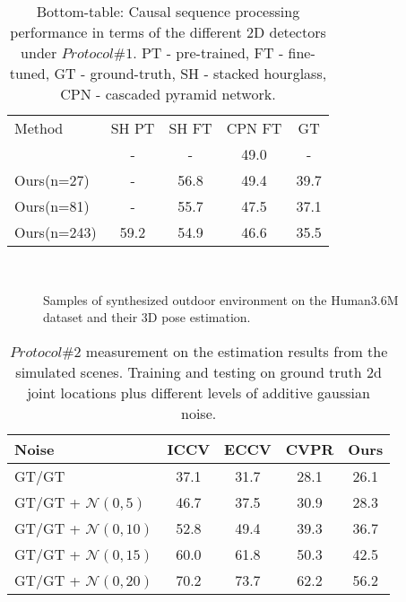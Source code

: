 \documentclass[twocolumn]{svjour3}          \smartqed  \usepackage{graphicx}
\begin{document}
\begin{table}[h]
	\begin{center}
			\begin{tabular}{l|c|c|c|c}
				\toprule
				Method & SH PT  & SH FT & CPN FT & GT \\
				\citep{Pavllo2019} & - & - & 49.0 & -\\
				Ours(n=27) & - & 56.8 & 49.4 & 39.7\\
				Ours(n=81) & - & 55.7 & 47.5 & 37.1\\
				Ours(n=243) & 59.2 & 54.9 & 46.6 & 35.5\\
				\bottomrule
			\end{tabular}
	\end{center}
	\caption{Bottom-table: Causal sequence processing performance in terms of the different 2D detectors  under $Protocol \#1$. PT - pre-trained, FT - fine-tuned, GT - ground-truth, SH - stacked hourglass, CPN - cascaded pyramid network.}
	\label{tb:causal}
\end{table}

\begin{figure}[h!]
\\
\caption{Samples of synthesized outdoor environment on the Human3.6M dataset and their 3D pose estimation.}\label{fig:noisyEffects}
\end{figure}

\begin{table*}[h!]
	\begin{center}
			\begin{tabular}{l|c c c c}
				\toprule
				 Noise & ICCV\citep{Martinez2017} & ECCV\citep{Hossain2018} & CVPR\citep{Pavllo2019} & Ours\\
				\midrule
				GT/GT & 37.1 & 31.7 & 28.1 & 26.1\\
				GT/GT + $\mathcal{N}(0,5)$  & 46.7 & 37.5 & 30.9 & 28.3\\
				GT/GT + $\mathcal{N}(0,10)$ & 52.8 & 49.4 & 39.3 & 36.7\\
				GT/GT + $\mathcal{N}(0,15)$ & 60.0 & 61.8 & 50.3 & 42.5\\
				GT/GT + $\mathcal{N}(0,20)$ & 70.2 & 73.7 & 62.2 & 56.2\\
				\bottomrule
			\end{tabular}
	\end{center}
	\caption{$Protocol \#2$ measurement on the estimation results from the simulated scenes. Training and testing on ground truth 2d joint locations plus different levels of additive gaussian noise.}
	\label{tb:noiseTable}
\end{table*}
\end{document}
